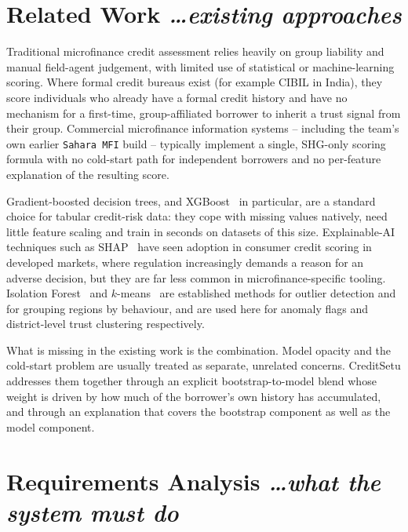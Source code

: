 \documentclass[11pt,a4paper]{article}
\newcommand{\BvrHint}[1]{%
  {\normalfont\normalsize\itshape\hfill #1}}
\begin{document}
\section{Related Work%
\BvrHint{\ldots existing approaches}}
\label{sec:related}

Traditional microfinance credit assessment relies heavily on group
liability and manual field-agent judgement, with limited use of statistical
or machine-learning scoring. Where formal credit bureaus exist (for example
CIBIL in India), they score individuals who already have a formal credit
history and have no mechanism for a first-time, group-affiliated borrower
to inherit a trust signal from their group. Commercial microfinance
information systems -- including the team's own earlier \texttt{Sahara MFI}
build -- typically implement a single, SHG-only scoring formula with no
cold-start path for independent borrowers and no per-feature explanation of
the resulting score.

Gradient-boosted decision trees, and XGBoost~\cite{xgboost} in particular,
are a standard choice for tabular credit-risk data: they cope with missing
values natively, need little feature scaling and train in seconds on
datasets of this size. Explainable-AI techniques such as SHAP~\cite{shap,
treeshap} have seen adoption in consumer credit scoring in developed
markets, where regulation increasingly demands a reason for an adverse
decision, but they are far less common in microfinance-specific tooling.
Isolation Forest~\cite{iforest} and $k$-means~\cite{kmeans} are established
methods for outlier detection and for grouping regions by behaviour, and
are used here for anomaly flags and district-level trust clustering
respectively.

What is missing in the existing work is the combination. Model opacity and
the cold-start problem are usually treated as separate, unrelated concerns.
CreditSetu addresses them together through an explicit bootstrap-to-model
blend whose weight is driven by how much of the borrower's own history has
accumulated, and through an explanation that covers the bootstrap
component as well as the model component.

\section{Requirements Analysis%
\BvrHint{\ldots what the system must do}}
\label{sec:req}
\end{document}
